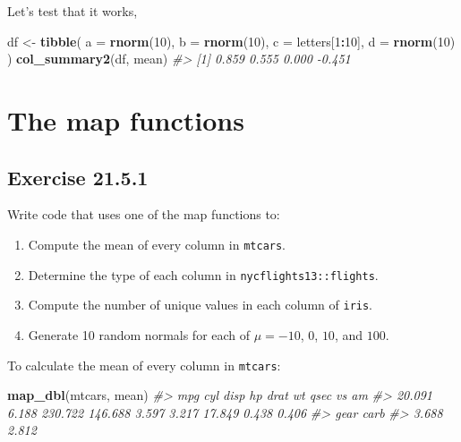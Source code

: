 \documentclass[]{book}
\newenvironment{Shaded}{\begin{snugshade}}{\end{snugshade}}
\newcommand{\CommentTok}[1]{\textcolor[rgb]{0.56,0.35,0.01}{\textit{#1}}}
\newcommand{\DataTypeTok}[1]{\textcolor[rgb]{0.13,0.29,0.53}{#1}}
\newcommand{\DecValTok}[1]{\textcolor[rgb]{0.00,0.00,0.81}{#1}}
\newcommand{\KeywordTok}[1]{\textcolor[rgb]{0.13,0.29,0.53}{\textbf{#1}}}
\newcommand{\NormalTok}[1]{#1}
\newcommand{\OperatorTok}[1]{\textcolor[rgb]{0.81,0.36,0.00}{\textbf{#1}}}
\newcommand{\StringTok}[1]{\textcolor[rgb]{0.31,0.60,0.02}{#1}}
\providecommand{\tightlist}{%
  \setlength{\itemsep}{0pt}\setlength{\parskip}{0pt}}
\theoremstyle{plain}
\theoremstyle{remark}
\theoremstyle{definition}
\theoremstyle{definition}
\theoremstyle{definition}
\theoremstyle{remark}
\begin{document}
Let's test that it works,

\begin{Shaded}
\begin{Highlighting}[]
\NormalTok{df <-}\StringTok{ }\KeywordTok{tibble}\NormalTok{(}
  \DataTypeTok{a =} \KeywordTok{rnorm}\NormalTok{(}\DecValTok{10}\NormalTok{),}
  \DataTypeTok{b =} \KeywordTok{rnorm}\NormalTok{(}\DecValTok{10}\NormalTok{),}
  \DataTypeTok{c =}\NormalTok{ letters[}\DecValTok{1}\OperatorTok{:}\DecValTok{10}\NormalTok{],}
  \DataTypeTok{d =} \KeywordTok{rnorm}\NormalTok{(}\DecValTok{10}\NormalTok{)}
\NormalTok{)}
\KeywordTok{col_summary2}\NormalTok{(df, mean)}
\CommentTok{#> [1]  0.859  0.555  0.000 -0.451}
\end{Highlighting}
\end{Shaded}

\hypertarget{the-map-functions}{%
\section{The map functions}\label{the-map-functions}}

\hypertarget{exercise-21.5.1}{%
\subsection*{\texorpdfstring{Exercise
{21.5.1}}{Exercise 21.5.1}}\label{exercise-21.5.1}}

Write code that uses one of the map functions to:

\begin{enumerate}
\def\labelenumi{\arabic{enumi}.}
\tightlist
\item
  Compute the mean of every column in \texttt{mtcars}.
\item
  Determine the type of each column in \texttt{nycflights13::flights}.
\item
  Compute the number of unique values in each column of \texttt{iris}.
\item
  Generate 10 random normals for each of \(\mu = -10\), \(0\), \(10\),
  and \(100\).
\end{enumerate}

To calculate the mean of every column in \texttt{mtcars}:

\begin{Shaded}
\begin{Highlighting}[]
\KeywordTok{map_dbl}\NormalTok{(mtcars, mean)}
\CommentTok{#>     mpg     cyl    disp      hp    drat      wt    qsec      vs      am }
\CommentTok{#>  20.091   6.188 230.722 146.688   3.597   3.217  17.849   0.438   0.406 }
\CommentTok{#>    gear    carb }
\CommentTok{#>   3.688   2.812}
\end{Highlighting}
\end{Shaded}
\end{document}
